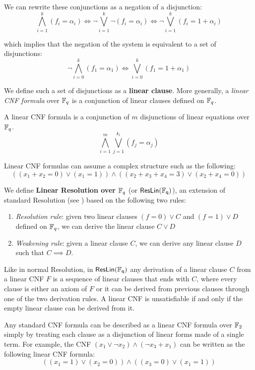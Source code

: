 \noindent
We can rewrite these conjunctions as a negation of a disjunction:
\[\bigwedge_{i = 1}^k (f_i = \alpha_i) \iff \lnot \bigvee_{i = 1}^k \lnot (f_i = \alpha_i) \iff \lnot \bigvee_{i = 1}^k (f_i = 1 + \alpha_i)\]

\noindent
which implies that the negation of the system is equivalent to a set of disjunctions:
\[\lnot \bigwedge_{i = 0}^k (f_1 = \alpha_1) \iff \bigvee_{i = 0}^k (f_1 = 1 + \alpha_1)\]

\noindent
We define such a set of disjunctions as a \textbf{linear clause}. More generally, a \textit{linear CNF formula} over $\mathbb{F}_q$ is a conjunction of linear clauses defined on $\mathbb{F}_q$.

\begin{definition}
 A linear CNF formula is a conjunction of $m$ disjunctions of linear equations over $\mathbb{F}_q$.
    \[\bigwedge_{i = 1}^m \bigvee_{j = 1}^{k_i} (f_j = \alpha_j)\]
\end{definition}

Linear CNF formulas can assume a complex structure such as the following:
\[((x_1+x_2 = 0) \lor (x_1 = 1)) \land ((x_2 + x_3 + x_4 = 3) \lor (x_2 + x_4 = 0))\]

We define \textbf{Linear Resolution over $\mathbb{F}_q$} (or $\mathsf{ResLin(\mathbb{F}_q)}$), an extension of standard Resolution (see ) based on the following two rules:
\begin{enumerate}
    \item \textit{Resolution rule}: given two linear clauses $(f = 0) \lor C$ and $(f = 1) \lor D$ defined on $\mathbb{F}_q$, we can derive the linear clause $C \lor D$
    \item \textit{Weakening rule}: given a linear clause $C$, we can derive any linear clause $D$ such that $C \implies D$.
\end{enumerate}

Like in normal Resolution, in $\mathsf{ResLin(\mathbb{F}_q)}$ any derivation of a linear clause $C$ from a linear CNF $F$ is a sequence of linear clauses that ends with $C$, where every clause is either an axiom of $F$ or it can be derived from previous clauses through one of the two derivation rules. A linear CNF is unsatisfiable if and only if the empty linear clause can be derived from it. 

Any standard CNF formula can be described as a linear CNF formula over $\mathbb{F}_2$ simply by treating each clause as a disjunction of linear forms made of a single term. For example, the CNF $(x_1 \lor \lnot{x_2}) \land (\lnot{x_3} + x_1)$ can be written as the following linear CNF formula:
\[((x_1 = 1) \lor (x_2 = 0)) \land ((x_3 = 0) \lor (x_1 = 1))\]

